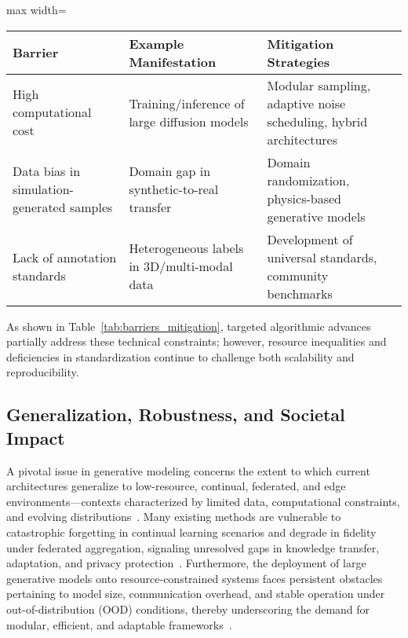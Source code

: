 \documentclass[sigconf]{acmart}
\begin{document}
\begin{table*}[htbp]
\centering
\caption{Technical barriers and mitigation strategies for large-scale generative models}
\label{tab:barriers_mitigation}
\begin{adjustbox}{max width=\textwidth}
\begin{tabular}{lll}
\toprule
\textbf{Barrier} & \textbf{Example Manifestation} & \textbf{Mitigation Strategies} \\
\midrule
High computational cost & Training/inference of large diffusion models & Modular sampling, adaptive noise scheduling, hybrid architectures \\
Data bias in simulation-generated samples & Domain gap in synthetic-to-real transfer & Domain randomization, physics-based generative models \\
Lack of annotation standards & Heterogeneous labels in 3D/multi-modal data & Development of universal standards, community benchmarks \\
\bottomrule
\end{tabular}
\end{adjustbox}
\end{table*}

As shown in Table~\ref{tab:barriers_mitigation}, targeted algorithmic advances partially address these technical constraints; however, resource inequalities and deficiencies in standardization continue to challenge both scalability and reproducibility.

\subsection{Generalization, Robustness, and Societal Impact}

A pivotal issue in generative modeling concerns the extent to which current architectures generalize to low-resource, continual, federated, and edge environments—contexts characterized by limited data, computational constraints, and evolving distributions~\cite{ref72,ref73}. Many existing methods are vulnerable to catastrophic forgetting in continual learning scenarios and degrade in fidelity under federated aggregation, signaling unresolved gaps in knowledge transfer, adaptation, and privacy protection~\cite{ref73}. Furthermore, the deployment of large generative models onto resource-constrained systems faces persistent obstacles pertaining to model size, communication overhead, and stable operation under out-of-distribution (OOD) conditions, thereby underscoring the demand for modular, efficient, and adaptable frameworks~\cite{ref73,ref74,ref88}.
\end{document}
